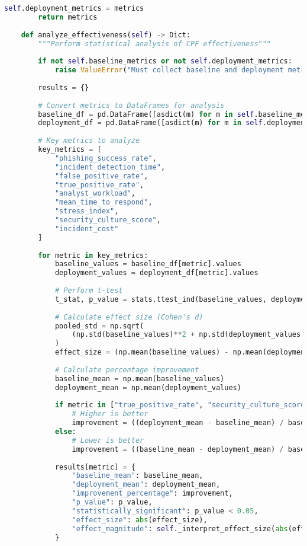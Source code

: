 \documentclass[11pt,a4paper]{article}
\begin{document}
\begin{lstlisting}[language=Python, caption=CPF Validation Framework]
        self.deployment_metrics = metrics
        return metrics
    
    def analyze_effectiveness(self) -> Dict:
        """Perform statistical analysis of CPF effectiveness"""
        
        if not self.baseline_metrics or not self.deployment_metrics:
            raise ValueError("Must collect baseline and deployment metrics first")
        
        results = {}
        
        # Convert metrics to DataFrames for analysis
        baseline_df = pd.DataFrame([asdict(m) for m in self.baseline_metrics])
        deployment_df = pd.DataFrame([asdict(m) for m in self.deployment_metrics])
        
        # Key metrics to analyze
        key_metrics = [
            "phishing_success_rate",
            "incident_detection_time",
            "false_positive_rate",
            "true_positive_rate",
            "analyst_workload",
            "mean_time_to_respond",
            "stress_index",
            "security_culture_score",
            "incident_cost"
        ]
        
        for metric in key_metrics:
            baseline_values = baseline_df[metric].values
            deployment_values = deployment_df[metric].values
            
            # Perform t-test
            t_stat, p_value = stats.ttest_ind(baseline_values, deployment_values)
            
            # Calculate effect size (Cohen's d)
            pooled_std = np.sqrt(
                (np.std(baseline_values)**2 + np.std(deployment_values)**2) / 2
            )
            effect_size = (np.mean(baseline_values) - np.mean(deployment_values)) / pooled_std
            
            # Calculate percentage improvement
            baseline_mean = np.mean(baseline_values)
            deployment_mean = np.mean(deployment_values)
            
            if metric in ["true_positive_rate", "security_culture_score", "automation_rate"]:
                # Higher is better
                improvement = ((deployment_mean - baseline_mean) / baseline_mean) * 100
            else:
                # Lower is better
                improvement = ((baseline_mean - deployment_mean) / baseline_mean) * 100
            
            results[metric] = {
                "baseline_mean": baseline_mean,
                "deployment_mean": deployment_mean,
                "improvement_percentage": improvement,
                "p_value": p_value,
                "statistically_significant": p_value < 0.05,
                "effect_size": abs(effect_size),
                "effect_magnitude": self._interpret_effect_size(abs(effect_size))
            }
        

\end{lstlisting}
\end{document}

